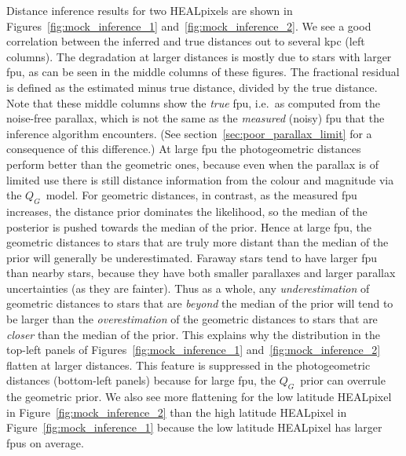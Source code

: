 \documentclass[twocolumn]{aastex62}
\providecommand{\QG}{\ensuremath{Q_G}}
\begin{document}
Distance inference results for two HEALpixels are shown in Figures~\ref{fig:mock_inference_1} and~\ref{fig:mock_inference_2}. 
We see a good correlation between the inferred and true distances out to several kpc (left columns). The degradation at larger distances is mostly due to stars with larger fpu, as can be seen in the middle columns of these figures. 
The fractional residual is defined as the estimated minus true distance, divided by the true distance.
Note that these middle columns show the {\em true} fpu, i.e.\ as computed from the noise-free parallax, which is not the same as the {\em measured} (noisy) fpu that the inference algorithm encounters. (See section~\ref{sec:poor_parallax_limit} for a consequence of this difference.)
At large fpu the photogeometric distances perform  better than the geometric ones, because even when the parallax is of limited use there is still distance information from the colour and magnitude via the \QG\ model. 
For geometric distances, in contrast, as the measured fpu increases, the distance prior dominates the likelihood, so the median of the posterior is pushed towards the median of the prior.
Hence at large fpu, the geometric distances to stars that are truly more distant than the median of the prior will generally be underestimated.
Faraway stars tend to have larger fpu than nearby stars, because they have both smaller parallaxes and larger parallax uncertainties (as they are fainter). 
Thus as a whole, any {\em underestimation} of geometric distances to stars that are {\em beyond} the median of the prior will tend to be larger than the {\em overestimation} of the geometric distances to stars that are {\em closer} than the median of the prior. This explains why the distribution in the top-left panels of Figures~\ref{fig:mock_inference_1} and~\ref{fig:mock_inference_2} flatten at larger distances.
This feature is suppressed in the photogeometric distances (bottom-left panels) because for large fpu, the \QG\ prior can overrule the geometric prior. We also see more flattening for the low latitude HEALpixel in Figure~\ref{fig:mock_inference_2} than the high latitude HEALpixel in Figure~\ref{fig:mock_inference_1} because the low latitude HEALpixel has larger fpus on average.
\end{document}
